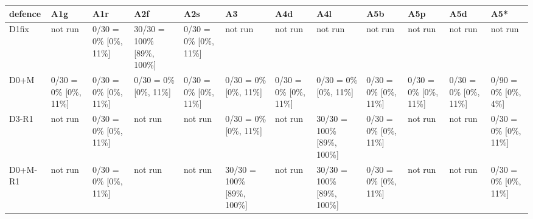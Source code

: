 \begin{tabular}{llllllllllll}
\toprule
defence & A1g & A1r & A2f & A2s & A3 & A4d & A4l & A5b & A5p & A5d & A5* \\
\midrule
D1fix & not run & 0/30 = 0\% [0\%, 11\%] & 30/30 = 100\% [89\%, 100\%] & 0/30 = 0\% [0\%, 11\%] & not run & not run & not run & not run & not run & not run & not run \\
D0+M & 0/30 = 0\% [0\%, 11\%] & 0/30 = 0\% [0\%, 11\%] & 0/30 = 0\% [0\%, 11\%] & 0/30 = 0\% [0\%, 11\%] & 0/30 = 0\% [0\%, 11\%] & 0/30 = 0\% [0\%, 11\%] & 0/30 = 0\% [0\%, 11\%] & 0/30 = 0\% [0\%, 11\%] & 0/30 = 0\% [0\%, 11\%] & 0/30 = 0\% [0\%, 11\%] & 0/90 = 0\% [0\%, 4\%] \\
D3-R1 & not run & 0/30 = 0\% [0\%, 11\%] & not run & not run & 0/30 = 0\% [0\%, 11\%] & not run & 30/30 = 100\% [89\%, 100\%] & 0/30 = 0\% [0\%, 11\%] & not run & not run & 0/30 = 0\% [0\%, 11\%] \\
D0+M-R1 & not run & 0/30 = 0\% [0\%, 11\%] & not run & not run & 30/30 = 100\% [89\%, 100\%] & not run & 30/30 = 100\% [89\%, 100\%] & 0/30 = 0\% [0\%, 11\%] & not run & not run & 0/30 = 0\% [0\%, 11\%] \\
\bottomrule
\end{tabular}
